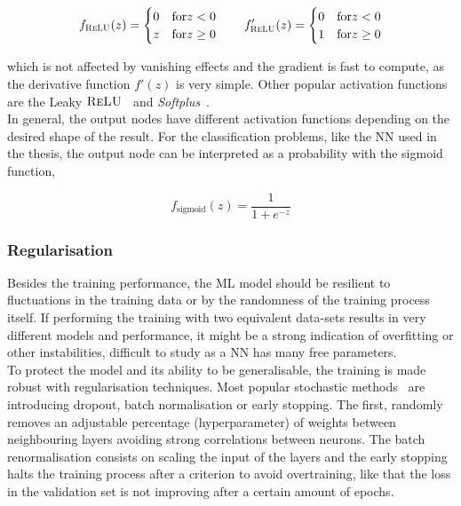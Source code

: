 \begin{align}
    f_\textsc{ReLU}(z)= \begin{cases}
            0& \text{for}  z<0 \\
            z& \text{for}  z\geq0\\
            \end{cases}\qquad f'_\textsc{ReLU}(z)= \begin{cases}
                0& \text{for}  z<0 \\
                1& \text{for}  z\geq0\\
                \end{cases}
\end{align}

which is not affected by vanishing effects and the gradient is fast to compute, as the derivative function $f'(z)$ is very simple. Other popular activation functions are the Leaky $\textsc{ReLU}$~\cite{lrelu} and \textit{Softplus}~\cite{Maas2013RectifierNI}.\\

In general, the output nodes have different activation functions depending on the desired shape of the result. For the classification problems, like the NN used in the thesis, the output node can be interpreted as a probability with the sigmoid function,

\begin{equation}
    f_\text{sigmoid}(z)=\frac{1}{1+e^{-z}}
\end{equation}

\subsubsection{Regularisation}

Besides the training performance, the ML model should be resilient to fluctuations in the training data or by the randomness of the training process itself. If performing the training with two equivalent data-sets results in very different models and performance, it might be a strong indication of overfitting or other instabilities, difficult to study as a NN has many free parameters.\\

To protect the model and its ability to be generalisable, the training is made robust with regularisation techniques. Most popular stochastic methods~\cite{JMLR:v15:srivastava14a,batchnorm,earlystop} are introducing dropout, batch normalisation or early stopping. The first, randomly removes an adjustable percentage (hyperparameter) of weights between neighbouring layers avoiding strong correlations between neurons. The batch renormalisation consists on scaling the input of the layers and the early stopping halts the training process after a criterion to avoid overtraining, like that the loss in the validation set is not improving after a certain amount of epochs.\\

